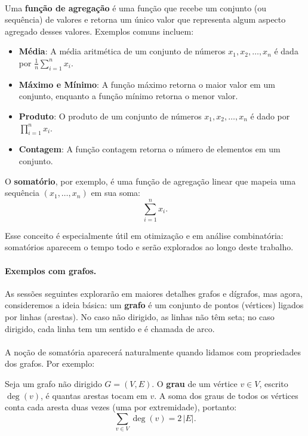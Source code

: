 \documentclass[12pt,a4paper]{article}
\def\emph#1{#1}%
\begin{document}
\paragraph{}
Uma \textbf{função de agregação} é uma função que recebe um conjunto (ou sequência) de valores e retorna um único valor que representa algum aspecto agregado desses valores. Exemplos comuns incluem:
\begin{itemize}
    \item \textbf{Média}: A média aritmética de um conjunto de números \(x_1, x_2, \ldots, x_n\) é dada por \(\frac{1}{n}\sum_{i=1}^{n} x_i\).
    \item \textbf{Máximo e Mínimo}: A função máximo retorna o maior valor em um conjunto, enquanto a função mínimo retorna o menor valor.
    \item \textbf{Produto}: O produto de um conjunto de números \(x_1, x_2, \ldots, x_n\) é dado por \(\prod_{i=1}^{n} x_i\).
    \item \textbf{Contagem}: A função contagem retorna o número de elementos em um conjunto.
\end{itemize}

O \textbf{somatório}, por exemplo, é uma função de agregação linear que mapeia uma sequência \((x_1,\dots,x_n)\) em sua soma:
\[\sum_{i=1}^{n} x_i.\]

Esse conceito é especialmente útil em otimização e em análise combinatória: somatórios aparecem o tempo todo e serão explorados ao longo deste trabalho.

\paragraph{Exemplos com grafos.}
As sessões seguintes explorarão em maiores detalhes grafos e dígrafos, mas agora, consideremos a ideia básica: um \textbf{grafo} é um conjunto de pontos (\emph{vértices}) ligados por linhas (\emph{arestas}). No caso \emph{não dirigido}, as linhas não têm seta; no caso \emph{dirigido}, cada linha tem um sentido e é chamada de \emph{arco}.

\paragraph{}
A noção de somatória aparecerá naturalmente quando lidamos com propriedades dos grafos. Por exemplo:

Seja um grafo não dirigido \(G=(V,E)\). O \textbf{grau} de um vértice \(v\in V\), escrito \(\deg(v)\), é quantas arestas tocam em \(v\). A soma dos graus de todos os vértices conta cada aresta \emph{duas vezes} (uma por extremidade), portanto:
\[\sum_{v\in V} \deg(v) = 2\,|E|.\]
\end{document}
